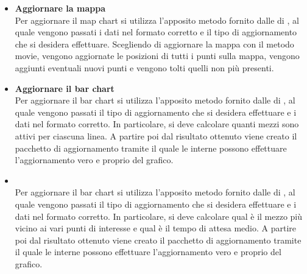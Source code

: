 \begin{itemize}
            \item \textbf{Aggiornare la mappa} \\
            Per aggiornare il map chart si utilizza l'apposito metodo fornito dalle  di , al quale vengono passati i dati nel formato corretto e il tipo di aggiornamento che si desidera effettuare. Scegliendo di aggiornare la mappa con il metodo movie, vengono aggiornate le posizioni di tutti i punti sulla mappa, vengono aggiunti eventuali nuovi punti e vengono tolti quelli non più presenti.
            
            \item \textbf{Aggiornare il bar chart} \\
            Per aggiornare il bar chart si utilizza l'apposito metodo fornito dalle  di , al quale vengono passati il tipo di aggiornamento che si desidera effettuare e i dati nel formato corretto. In particolare, si deve calcolare quanti mezzi sono attivi per ciascuna linea. A partire poi dal risultato ottenuto viene creato il pacchetto di aggiornamento tramite il quale le  interne possono effettuare l'aggiornamento vero e proprio del grafico.
            
            \item {} \\
            Per aggiornare il bar chart si utilizza l'apposito metodo fornito dalle  di , al quale vengono passati il tipo di aggiornamento che si desidera effettuare e i dati nel formato corretto. In particolare, si deve calcolare qual è il mezzo più vicino ai vari punti di interesse e qual è il tempo di attesa medio. A partire poi dal risultato ottenuto viene creato il pacchetto di aggiornamento tramite il quale le  interne possono effettuare l'aggiornamento vero e proprio del grafico.

        \end{itemize}

